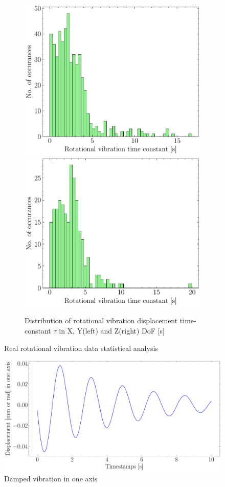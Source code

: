 \begin{figure}[H]
    \begin{subfigure}{\linewidth}
    \includegraphics[width=.5\linewidth]{images/fig_chapter4/data_dist/11.pdf}\hfill
    \includegraphics[width=.5\linewidth]{images/fig_chapter4/data_dist/12.pdf}
    \caption{Distribution of rotational vibration displacement time-constant $ \tau $ in X, Y(left) and Z(right) DoF [s]}
    \end{subfigure}

\caption{Real rotational vibration data statistical analysis}
\label{fig:dist_rot}
\end{figure}

\begin{figure}[H]
    \centering
    \includegraphics[scale=0.3]{images/fig_chapter4/vib_damped.pdf}
    \caption{Damped vibration in one axis}
    \label{fig:damped_vib}
\end{figure}


